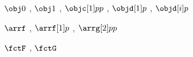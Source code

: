 $\obj0$ , $\obj1$ , $\objc[1]pp$ , $\objd[1]p$ , $\objd[i]p$ \par
$\arrf$ , $\arrf[1]p$ , $\arrg[2]pp$ \par
$\fctF$ , $\fctG$

\newcommand{\opr}[2][\catC]{                      %
  \plr\smash{\overset{\mclap{\small #1}}{#2}}
}

\def\RegistMathOpr#1#2{
  TODO
}